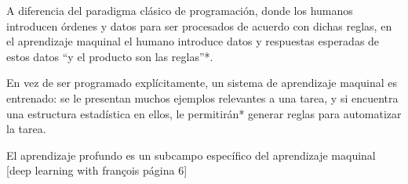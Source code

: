 A diferencia del paradigma clásico de programación, donde los humanos introducen órdenes y datos para ser procesados de acuerdo con dichas reglas, en el aprendizaje maquinal el humano introduce datos y respuestas esperadas de estos datos ``y el producto son las reglas''*.

En vez de ser programado explícitamente, un sistema de aprendizaje maquinal es entrenado: se le presentan muchos ejemplos relevantes a una tarea, y si encuentra una estructura estadística en ellos, le permitirán* generar reglas para automatizar la tarea.

El aprendizaje profundo es un subcampo específico del aprendizaje maquinal [deep learning with françois página 6]